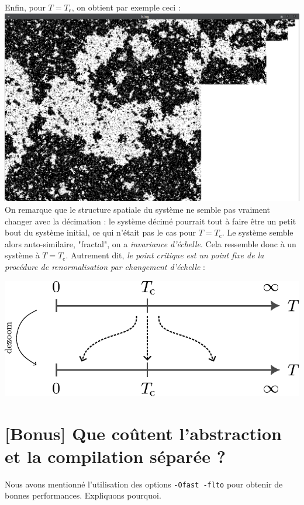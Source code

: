 \documentclass{book}
\newcommand{\inline}[1]{\texttt{#1}}
\begin{document}
\begin{correction}
Enfin, pour $T = T_\text{c}$, on obtient par exemple ceci :\\
\includegraphics[width=1\linewidth]{TD3/decim_T_sur_Tc_1.00.png}\\
On remarque que le structure spatiale du système ne semble pas vraiment changer avec la décimation : le système décimé pourrait tout à faire être un petit bout du système initial, ce qui n'était pas le cas pour $T = T_\text{c}$. Le système semble alors auto-similaire, "fractal", on a \emph{invariance d'échelle}. Cela ressemble donc à un système à $T = T_\text{c}$. Autrement dit, \emph{le point critique est un point fixe de la procédure de renormalisation par changement d'échelle} :

\begin{center}
\includegraphics[width=0.5\linewidth]{TD3/renorm.pdf}
\end{center}

\end{correction}


\section{[Bonus] Que coûtent l'abstraction et la compilation séparée ?}

Nous avons mentionné l'utilisation des options \inline{-Ofast -flto} pour obtenir de bonnes performances. Expliquons pourquoi.\\
\end{document}
